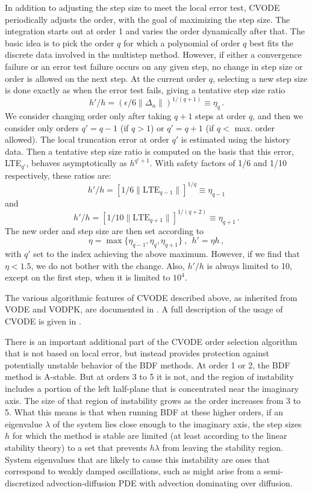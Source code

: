 In addition to adjusting the step size to meet the local error test,
CVODE periodically adjusts the order, with the goal of maximizing the
step size.  The integration starts out at order 1 and varies the order
dynamically after that.  The basic idea is to pick the order $q$ for
which a polynomial of order $q$ best fits the discrete data involved
in the multistep method.  However, if either a convergence failure or
an error test failure occurs on any given step, no change in step
size or order is allowed on the next step.  At the current order $q$,
selecting a new step size is done exactly as when the error test
fails, giving a tentative step size ratio
\[ h'/h = (\epsilon / 6 \|\Delta_n\| )^{1/(q+1)} \equiv \eta_q \, . \]
We consider changing order only after taking $q+1$ steps at order $q$,
and then we consider only orders $q' = q - 1$ (if $q > 1$) or
$q' = q + 1$ (if $q < $ max. order allowed).  The local truncation
error at order $q'$ is estimated using the history data.  Then a
tentative step size ratio is computed on the basis that this error,
LTE$_{q'}$, behaves asymptotically as $h^{q'+1}$.  With safety factors
of 1/6 and 1/10 respectively, these ratios are:
\[ h'/h = [1 / 6 \|\mbox{LTE}_{q-1}\| ]^{1/q} \equiv \eta_{q-1} \]
and
\[ h'/h = [1 / 10 \|\mbox{LTE}_{q+1}\| ]^{1/(q+2)} \equiv \eta_{q+1} \, . \]
The new order and step size are then set according to
\[ \eta = \max\{\eta_{q-1},\eta_q,\eta_{q+1}\} ~,~~ h' = \eta h \, , \]
with $q'$ set to the index achieving the above maximum.
However, if we find that $\eta < 1.5$, we do not bother with the
change.  Also, $h'/h$ is always limited to 10, except on the first
step, when it is limited to $10^4$.

The various algorithmic features of CVODE described above, as
inherited from VODE and VODPK, are documented in 
\cite{BBH:89,Byr:92,Hin:00}.  A full description of the usage
of CVODE is given in \cite{HiSe:04cvode}.

There is an important additional part of the CVODE order selection
algorithm that is not based on local error, but instead provides
protection against potentially unstable behavior of the BDF methods.
At order 1 or 2, the BDF method is A-stable.  But at orders 3 to 5 it
is not, and the region of instability includes a portion of the left
half-plane that is concentrated near the imaginary axis.  The size of
that region of instability grows as the order increases from 3 to 5.
What this means is that when running BDF at these higher orders, if
an eigenvalue $\lambda$ of the system lies close enough to the
imaginary axis, the step sizes $h$ for which the method is stable are
limited (at least according to the linear stability theory) to a set
that prevents $h\lambda$ from leaving the stability region.  System
eigenvalues that are likely to cause this instability are ones that
correspond to weakly damped oscillations, such as might arise from a
semi-discretized advection-diffusion PDE with advection dominating
over diffusion.

